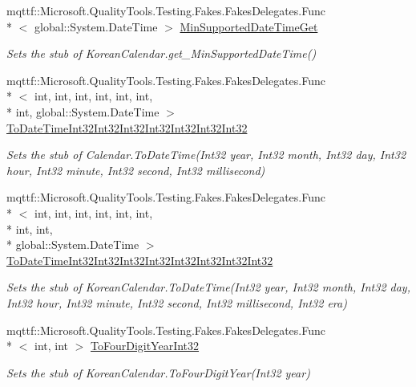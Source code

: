 \begin{DoxyCompactItemize}
mqttf\-::\-Microsoft.\-Quality\-Tools.\-Testing.\-Fakes.\-Fakes\-Delegates.\-Func\\*
$<$ global\-::\-System.\-Date\-Time $>$ \hyperlink{class_system_1_1_globalization_1_1_fakes_1_1_stub_korean_calendar_a45bf52fbc8fe045c2ea62e2432681c7d}{Min\-Supported\-Date\-Time\-Get}
\begin{DoxyCompactList}\small\item\em Sets the stub of Korean\-Calendar.\-get\-\_\-\-Min\-Supported\-Date\-Time()\end{DoxyCompactList}\item 
mqttf\-::\-Microsoft.\-Quality\-Tools.\-Testing.\-Fakes.\-Fakes\-Delegates.\-Func\\*
$<$ int, int, int, int, int, int, \\*
int, global\-::\-System.\-Date\-Time $>$ \hyperlink{class_system_1_1_globalization_1_1_fakes_1_1_stub_korean_calendar_a81174b80fb4c0847b3d065388af25669}{To\-Date\-Time\-Int32\-Int32\-Int32\-Int32\-Int32\-Int32\-Int32}
\begin{DoxyCompactList}\small\item\em Sets the stub of Calendar.\-To\-Date\-Time(\-Int32 year, Int32 month, Int32 day, Int32 hour, Int32 minute, Int32 second, Int32 millisecond)\end{DoxyCompactList}\item 
mqttf\-::\-Microsoft.\-Quality\-Tools.\-Testing.\-Fakes.\-Fakes\-Delegates.\-Func\\*
$<$ int, int, int, int, int, int, \\*
int, int, \\*
global\-::\-System.\-Date\-Time $>$ \hyperlink{class_system_1_1_globalization_1_1_fakes_1_1_stub_korean_calendar_abf31e9beac585487d0a75b42be13c14d}{To\-Date\-Time\-Int32\-Int32\-Int32\-Int32\-Int32\-Int32\-Int32\-Int32}
\begin{DoxyCompactList}\small\item\em Sets the stub of Korean\-Calendar.\-To\-Date\-Time(\-Int32 year, Int32 month, Int32 day, Int32 hour, Int32 minute, Int32 second, Int32 millisecond, Int32 era)\end{DoxyCompactList}\item 
mqttf\-::\-Microsoft.\-Quality\-Tools.\-Testing.\-Fakes.\-Fakes\-Delegates.\-Func\\*
$<$ int, int $>$ \hyperlink{class_system_1_1_globalization_1_1_fakes_1_1_stub_korean_calendar_aef6a88fa0d76bb2000b2c3d163d0dce7}{To\-Four\-Digit\-Year\-Int32}
\begin{DoxyCompactList}\small\item\em Sets the stub of Korean\-Calendar.\-To\-Four\-Digit\-Year(\-Int32 year)\end{DoxyCompactList}\item 

\end{DoxyCompactItemize}
